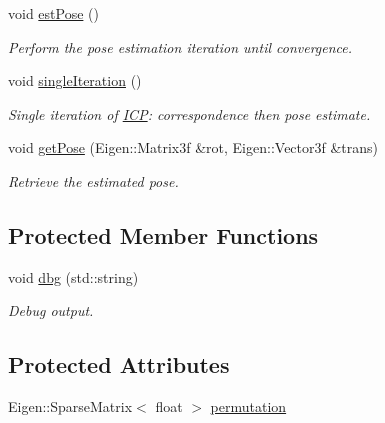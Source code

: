 \begin{DoxyCompactItemize}
void \hyperlink{classICP_a8168f085dc9bf3916ea9b170f4a8b6f3}{est\-Pose} ()
\begin{DoxyCompactList}\small\item\em \-Perform the pose estimation iteration until convergence. \end{DoxyCompactList}\item 
void \hyperlink{classICP_a1dfd1ad0ea3c83ade91595cc3ecd24f2}{single\-Iteration} ()
\begin{DoxyCompactList}\small\item\em \-Single iteration of \hyperlink{classICP}{\-I\-C\-P}\-: correspondence then pose estimate. \end{DoxyCompactList}\item 
void \hyperlink{classICP_af9624105149162bf1c80b2e70cbcf135}{get\-Pose} (\-Eigen\-::\-Matrix3f \&rot, \-Eigen\-::\-Vector3f \&trans)
\begin{DoxyCompactList}\small\item\em \-Retrieve the estimated pose. \end{DoxyCompactList}\end{DoxyCompactItemize}
\subsection*{\-Protected \-Member \-Functions}
\begin{DoxyCompactItemize}
\item 
void \hyperlink{classICP_a5e20a89dfd2f5f95a61122d268375b72}{dbg} (std\-::string)
\begin{DoxyCompactList}\small\item\em \-Debug output. \end{DoxyCompactList}\end{DoxyCompactItemize}
\subsection*{\-Protected \-Attributes}
\begin{DoxyCompactItemize}
\item 
\-Eigen\-::\-Sparse\-Matrix$<$ float $>$ \hyperlink{classICP_aade0504cb0e1d5abcb2c2add2be606b1}{permutation}
\end{DoxyCompactItemize}
